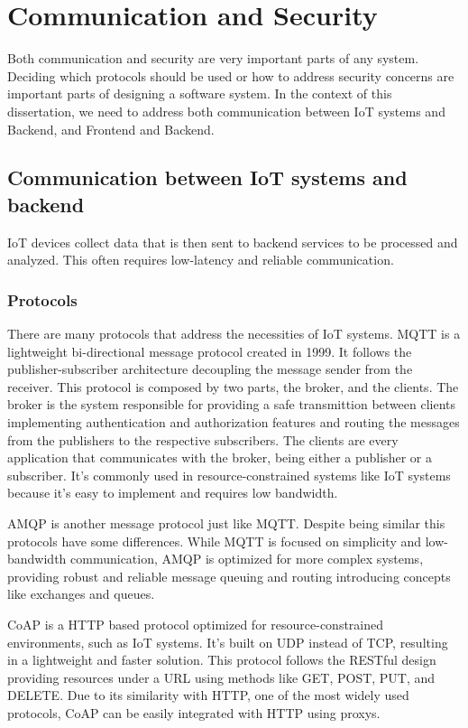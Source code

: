 \section{Communication and Security}
Both communication and security are very important parts of any system.
Deciding which protocols should be used or how to address security concerns are
important parts of designing a software system. In the context of this
dissertation, we need to address both communication between \gls{IoT} systems and
Backend, and Frontend and Backend.


\subsection{Communication between IoT systems and backend}
\gls{IoT} devices collect data that is then sent to backend services to be processed
and analyzed. This often requires low-latency and reliable communication.
\subsubsection{Protocols}
There are many protocols that address the necessities of \gls{IoT} systems.
MQTT is a lightweight bi-directional message protocol created in 1999.
It follows the publisher-subscriber architecture decoupling the message
sender from the receiver. This protocol is composed by two parts, the
broker, and the clients. The broker is the system responsible for providing
a safe transmittion between clients implementing authentication and
authorization features and routing the messages from the publishers to
the respective subscribers. The clients are every application that
communicates with the broker, being either a publisher or a subscriber.
It's commonly used in resource-constrained systems like IoT systems because
it's easy to implement and requires low bandwidth.

\gls{AMQP} is another message protocol just like \gls{MQTT}.
Despite being similar this protocols have some differences. While \gls{MQTT} is
focused on simplicity and low-bandwidth communication, \gls{AMQP} is optimized for
more complex systems, providing robust and reliable message queuing and
routing introducing concepts like exchanges and queues.

\gls{CoAP} is a \gls{HTTP} based protocol optimized for resource-constrained
environments, such as \gls{IoT} systems. It's built on \gls{UDP} instead of \gls{TCP},
resulting in a lightweight and faster solution.
This protocol follows the \gls{REST}ful design providing resources under a \gls{URL}
using methods like GET, POST, PUT, and DELETE. Due to its similarity with
\gls{HTTP}, one of the most widely used protocols, \gls{CoAP} can be easily integrated
with \gls{HTTP} using proxys.

